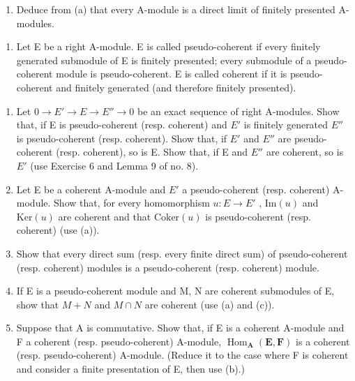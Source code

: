 \begin{enumerate}
\def\labelenumi{(\alph{enumi})}
\setcounter{enumi}{1}
\tightlist
\item
  Deduce from (a) that every A-module is a direct limit of finitely presented A-modules.
\end{enumerate}

\begin{enumerate}
\def\labelenumi{\arabic{enumi}.}
\setcounter{enumi}{10}
\tightlist
\item
  Let E be a right A-module. E is called pseudo-coherent if every finitely generated submodule of E is finitely presented; every submodule of a pseudo-coherent module is pseudo-coherent. E is called coherent if it is pseudo-coherent and finitely generated (and therefore finitely presented).
\end{enumerate}

\begin{enumerate}
\def\labelenumi{(\alph{enumi})}
\item
  Let \(0 \to E' \to E \to E'' \to 0\) be an exact sequence of right A-modules. Show that, if E is pseudo-coherent (resp. coherent) and \(E'\) is finitely generated \(E''\) is pseudo-coherent (resp. coherent). Show that, if \(E'\) and \(E''\) are pseudo-coherent (resp. coherent), so is E. Show that, if E and \(E''\) are coherent, so is \(E'\) (use Exercise 6 and Lemma 9 of no. 8).
\item
  Let E be a coherent A-module and \(E'\) a pseudo-coherent (resp. coherent) A-module. Show that, for every homomorphism \(u: E \to E'\) , \(\text{Im}(u)\) and \(\text{Ker}(u)\) are coherent and that \(\text{Coker}(u)\) is pseudo-coherent (resp. coherent) (use (a)).
\item
  Show that every direct sum (resp. every finite direct sum) of pseudo-coherent (resp. coherent) modules is a pseudo-coherent (resp. coherent) module.
\item
  If E is a pseudo-coherent module and M, N are coherent submodules of E, show that \(M + N\) and \(M \cap N\) are coherent (use (a) and (c)).
\item
  Suppose that A is commutative. Show that, if E is a coherent A-module and F a coherent (resp. pseudo-coherent) A-module, \(\operatorname{Hom}_{\mathbf{A}}(\mathbf{E}, \mathbf{F})\) is a coherent (resp. pseudo-coherent) A-module. (Reduce it to the case where F is coherent and consider a finite presentation of E, then use (b).)
\end{enumerate}

